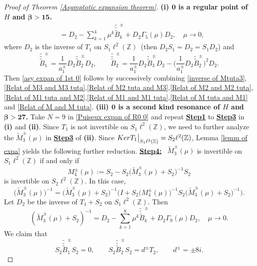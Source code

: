 \documentclass[10pt,a4paper]{amsart}
\newcommand\Z{\mathbb{Z}}
\numberwithin{equation}{section}
\begin{document}
\begin{proof}[Proof of Theorem {\rm\ref{Asymptotic expansion theorem}}]{\bf{(i) ${\bm{0}}$ is a regular point of $H$ and {$\bm{\beta>15}$}.}}
\begin{align}
&=D_2-\sum\limits_{k=1}^{4}\mu^k\tilde{\tilde{\tilde{B}}}^{\pm}_{k}+D_2\Gamma_5(\mu)D_2,\quad \mu\rightarrow0,
\end{align}
where $D_2$ is the inverse of $T_1$ on $S_1\ell^2(\Z)$~(then $D_2S_1=D_2=S_1D_2$) and
\begin{equation}\label{expre of Btttpm tuta} \tilde{\tilde{\tilde{B}}}^{\pm}_{1}=\frac{1}{a^{\pm}_{1}}D_2\tilde{\tilde{B}}^{\pm}_2D_2,\qquad\tilde{\tilde{\tilde{B}}}^{\pm}_{2}=\frac{1}{a^{\pm}_{1}}D_2\tilde{\tilde{B}}^{\pm}_3D_2-\Big(\frac{1}{a^{\pm}_{1}}D_2\tilde{\tilde{B}}^{\pm}_2\Big)^2D_2.
\end{equation}
Then \eqref{asy expan of 1st 0} follows by successively combining \eqref{inverse of Mtuta3},\eqref{Relat of M3 and M3 tuta},\eqref{Relat of M2 tuta and M3},\eqref{Relat of M2 and M2 tuta},\eqref{Relat of M1 tuta and M2},\eqref{Relat of M1 and M1 tuta},\eqref{Relat of M tuta and M1} and \eqref{Relat of M and M tuta}.
\vskip0.2cm
{\bf{(iii) ${\bm{0}}$ is a second kind resonance of $H$ and {$\bm{\beta>27}$}.}} Take $N=9$ in \eqref{Puiseux expan of R0 0} and repeat {\bf{\underline{Step1}}} to {\bf{\underline{Step3}}} in {\bf{(i)}} and {\bf{(ii)}}. Since $T_1$ is not invertible on $S_1\ell^2(\Z)$, we need to further analyze the $\widetilde{M}^{\pm}_3(\mu)$ in {\bf{\underline{Step3}}} of {\bf{(ii)}}. Since ${\rm Ker}T_1\big|_{S_1\ell^2(\Z)}=S_2\ell^2(\Z)$, Lemma \ref{lemm of expa} yields the following further reduction.
\vskip0.15cm
{\bf{\underline{Step4:}}} \ $\widetilde{M}_{3}^{\pm}(\mu)$ is invertible on $S_1\ell^{2}(\Z)$ if and only if $$ M^{\pm}_{4}(\mu):=S_2-S_2\big(\widetilde{M}_{3}^{\pm}(\mu)+S_2\big)^{-1}S_2$$ is invertible on $S_2\ell^{2}(\Z)$. In this case,
\begin{equation}\label{Relat of M3 tuta and M4}
\big(\widetilde{M}_{3}^{\pm}(\mu)\big)^{-1}=\big(\widetilde{M}_{3}^{\pm}(\mu)+S_2\big)^{-1}\Big(I+S_2\big(M^{\pm}_{4}(\mu)\big)^{-1}S_2\big(\widetilde{M}_{3}^{\pm}(\mu)+S_2\big)^{-1}\Big).
\end{equation}
Let $D_2$ be the inverse of $T_1+S_2$ on $S_1\ell^2(\Z)$.
Then 
\begin{equation*}
\left(\widetilde{M}_{3}^{\pm}(\mu)+S_2\right)^{-1}=D_2-\sum\limits_{k=1}^{8}\mu^k\tilde{\tilde{\tilde{B}}}^{\pm}_{k}+D_2\Gamma_9(\mu)D_2, \quad \mu\rightarrow0.
\end{equation*}
We claim that  \begin{equation}\label{S2Bttt1S2,S2Bttt2S2}
S_2\tilde{\tilde{\tilde{B}}}^{\pm}_{1}S_2=0, \qquad S_2\tilde{\tilde{\tilde{B}}}^{\pm}_{2}S_2=d^{\pm}T_2,\qquad d^{\pm}=\pm8i.

\end{equation}
\end{proof}
\end{document}
